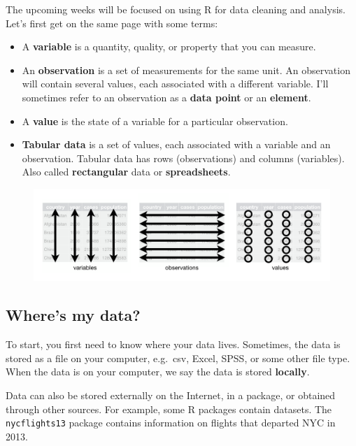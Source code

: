 \documentclass[]{book}
\begin{document}
The upcoming weeks will be focused on using R for data cleaning and
analysis. Let's first get on the same page with some terms:

\begin{itemize}
\item
  A \textbf{variable} is a quantity, quality, or property that you can
  measure.
\item
  An \textbf{observation} is a set of measurements for the same unit. An
  observation will contain several values, each associated with a
  different variable. I'll sometimes refer to an observation as a
  \textbf{data point} or an \textbf{element}.
\item
  A \textbf{value} is the state of a variable for a particular
  observation.
\item
  \textbf{Tabular data} is a set of values, each associated with a
  variable and an observation. Tabular data has rows (observations) and
  columns (variables). Also called \textbf{rectangular} data or
  \textbf{spreadsheets}.
\end{itemize}

\begin{figure}
\centering
\includegraphics{img/tidy-1.png}
\caption{}
\end{figure}

\subsection{Where's my data?}\label{wheres-my-data}

To start, you first need to know where your data lives. Sometimes, the
data is stored as a file on your computer, e.g.~csv, Excel, SPSS, or
some other file type. When the data is on your computer, we say the data
is stored \textbf{locally}.

Data can also be stored externally on the Internet, in a package, or
obtained through other sources. For example, some R packages contain
datasets. The \texttt{nycflights13} package contains information on
flights that departed NYC in 2013.
\end{document}
